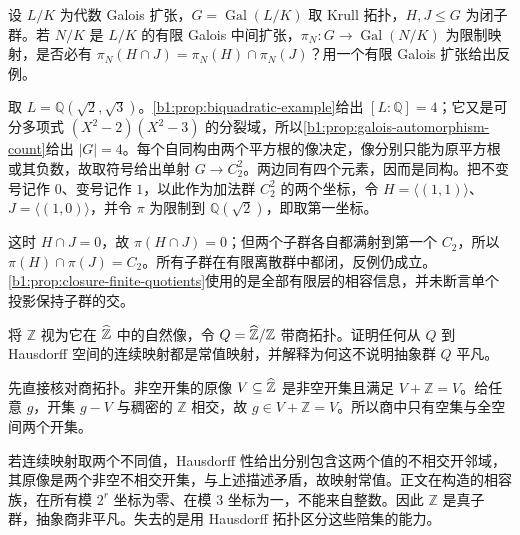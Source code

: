\begin{exercise}\label{b1:ex:22-17}
	设 \(L/K\) 为代数 Galois 扩张，\(G=\operatorname{Gal}(L/K)\) 取 Krull 拓扑，\(H,J\leq G\) 为闭子群。若 \(N/K\) 是 \(L/K\) 的有限 Galois 中间扩张，\(\pi_N:G\to\operatorname{Gal}(N/K)\) 为限制映射，是否必有 \(\pi_N(H\cap J)=\pi_N(H)\cap\pi_N(J)\)？用一个有限 Galois 扩张给出反例。
\end{exercise}
\begin{solution}
	取 \(L=\mathbb Q(\sqrt2,\sqrt3)\)。\cref{b1:prop:biquadratic-example}给出 \([L:\mathbb Q]=4\)；它又是可分多项式 \((X^2-2)(X^2-3)\) 的分裂域，所以\cref{b1:prop:galois-automorphism-count}给出 \(|G|=4\)。每个自同构由两个平方根的像决定，像分别只能为原平方根或其负数，故取符号给出单射 \(G\rightarrow C_2^2\)。两边同有四个元素，因而是同构。把不变号记作 \(0\)、变号记作 \(1\)，以此作为加法群 \(C_2^2\) 的两个坐标，令 \(H=\langle(1,1)\rangle\)、\(J=\langle(1,0)\rangle\)，并令 \(\pi\) 为限制到 \(\mathbb Q(\sqrt2)\)，即取第一坐标。

	这时 \(H\cap J=0\)，故 \(\pi(H\cap J)=0\)；但两个子群各自都满射到第一个 \(C_2\)，所以 \(\pi(H)\cap\pi(J)=C_2\)。所有子群在有限离散群中都闭，反例仍成立。\cref{b1:prop:closure-finite-quotients}使用的是全部有限层的相容信息，并未断言单个投影保持子群的交。
\end{solution}

\begin{exercise}\label{b1:ex:22-18}
	将 \(\mathbb Z\) 视为它在 \(\widehat{\vphantom{Z}\mathbb Z}\) 中的自然像，令 \(Q=\widehat{\vphantom{Z}\mathbb Z}/\mathbb Z\) 带商拓扑。证明任何从 \(Q\) 到 Hausdorff 空间的连续映射都是常值映射，并解释为何这不说明抽象群 \(Q\) 平凡。
\end{exercise}
\begin{solution}
	先直接核对商拓扑。非空开集的原像 \(V\subseteq\widehat{\vphantom{Z}\mathbb Z}\) 是非空开集且满足 \(V+\mathbb Z=V\)。给任意 \(g\)，开集 \(g-V\) 与稠密的 \(\mathbb Z\) 相交，故 \(g\in V+\mathbb Z=V\)。所以商中只有空集与全空间两个开集。

	若连续映射取两个不同值，Hausdorff 性给出分别包含这两个值的不相交开邻域，其原像是两个非空不相交开集，与上述描述矛盾，故映射常值。正文在构造的相容族，在所有模 \(2^r\) 坐标为零、在模 \(3\) 坐标为一，不能来自整数。因此 \(\mathbb Z\) 是真子群，抽象商非平凡。失去的是用 Hausdorff 拓扑区分这些陪集的能力。
\end{solution}

